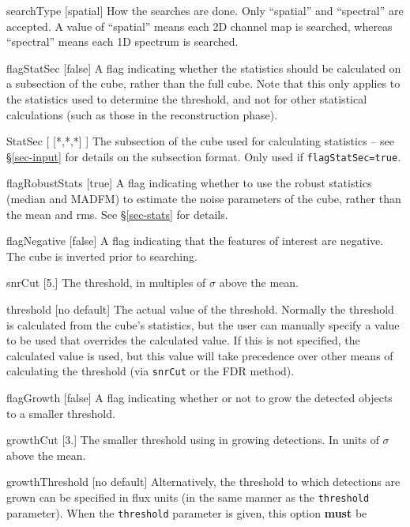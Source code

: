 
\begin{Lentry}
\item[{searchType [spatial]}] How the searches are done. Only
  ``spatial'' and ``spectral'' are accepted. A value of ``spatial''
  means each 2D channel map is searched, whereas ``spectral'' means
  each 1D spectrum is searched.
\item[{flagStatSec [false]}] A flag indicating whether the
  statistics should be calculated on a subsection of the cube, rather
  than the full cube. Note that this only applies to the statistics
  used to determine the threshold, and not for other statistical
  calculations (such as those in the reconstruction phase).
\item[{StatSec [ [*,*,*] ]}] The subsection of the cube used
  for calculating statistics -- see \S\ref{sec-input} for details on
 the subsection format. Only used if \texttt{flagStatSec=true}.
\item[{flagRobustStats [true]}] A flag indicating whether to use the
  robust statistics (median and MADFM) to estimate the noise
  parameters of the cube, rather than the mean and rms. See
  \S\ref{sec-stats} for details.
\item[{flagNegative [false]}] A flag indicating that the
  features of interest are negative. The cube is inverted prior to
  searching.
\item[{snrCut [5.]}] The threshold, in multiples of $\sigma$ above
  the mean.
\item[{threshold [no default]}] The actual value of the
  threshold. Normally the threshold is calculated from the cube's
  statistics, but the user can manually specify a value to be used
  that overrides the calculated value. If this is not specified, the
  calculated value is used, but this value will take precedence over
  other means of calculating the threshold (\ie via \texttt{snrCut} or
  the FDR method).
\item[{flagGrowth [false]}] A flag indicating whether or not to
  grow the detected objects to a smaller threshold.
\item[{growthCut [3.]}] The smaller threshold using in growing
  detections. In units of $\sigma$ above the mean.
\item[{growthThreshold [no default]}] Alternatively, the threshold to
  which detections are grown can be specified in flux units (in the
  same manner as the \texttt{threshold} parameter). When the
  \texttt{threshold} parameter is given, this option \textbf{must} be

\end{Lentry}
